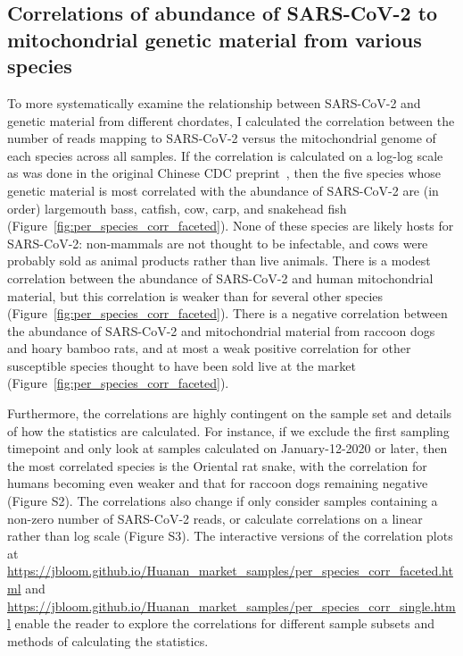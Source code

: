 \documentclass[9pt,twocolumn,twoside]{gsajnl_modified}
\begin{document}
\subsection{Correlations of abundance of SARS-CoV-2 to mitochondrial genetic material from various species}
To more systematically examine the relationship between SARS-CoV-2 and genetic material from different chordates, I calculated the correlation between the number of reads mapping to SARS-CoV-2 versus the mitochondrial genome of each species across all samples.
If the correlation is calculated on a log-log scale as was done in the original Chinese CDC preprint~\citep{liu2022surveillance}, then the five species whose genetic material is most correlated with the abundance of SARS-CoV-2 are (in order) largemouth bass, catfish, cow, carp, and snakehead fish (Figure~\ref{fig:per_species_corr_faceted}).
None of these species are likely hosts for SARS-CoV-2: non-mammals are not thought to be infectable, and cows were probably sold as animal products rather than live animals.
There is a modest correlation between the abundance of SARS-CoV-2 and human mitochondrial material, but this correlation is weaker than for several other species (Figure~\ref{fig:per_species_corr_faceted}).
There is a negative correlation between the abundance of SARS-CoV-2 and mitochondrial material from raccoon dogs and hoary bamboo rats, and at most a weak positive correlation for other susceptible species thought to have been sold live at the market (Figure~\ref{fig:per_species_corr_faceted}).

Furthermore, the correlations are highly contingent on the sample set and details of how the statistics are calculated.
For instance, if we exclude the first sampling timepoint and only look at samples calculated on January-12-2020 or later, then the most correlated species is the Oriental rat snake, with the correlation for humans becoming even weaker and that for raccoon dogs remaining negative (Figure S2).
The correlations also change if only consider samples containing a non-zero number of SARS-CoV-2 reads, or calculate correlations on a linear rather than log scale (Figure S3).
The interactive versions of the correlation plots at \url{https://jbloom.github.io/Huanan_market_samples/per_species_corr_faceted.html} and \url{https://jbloom.github.io/Huanan_market_samples/per_species_corr_single.html} enable the reader to explore the correlations for different sample subsets and methods of calculating the statistics.
\end{document}
